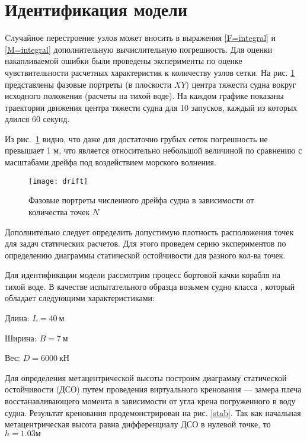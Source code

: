 \section{Идентификация модели}

Cлучайное перестроение узлов может вносить в выражения \eqref{F=integral} и \eqref{M=integral} дополнительную вычислительную погрешность. Для оценки накапливаемой ошибки были проведены эксперименты по оценке чувствительности расчетных характеристик к количеству узлов сетки. На рис. \ref{drift} представлены фазовые портреты  (в плоскости $XY$) центра тяжести судна вокруг исходного положения (расчеты на тихой воде). На каждом графике показаны траектории движения центра тяжести судна для 10 запусков, каждый из которых длился 60 секунд.

Из рис.~\ref{drift} видно, что даже для достаточно грубых сеток погрешность не превышает 1 м, что является относительно небольшой величиной по сравнению с масштабами дрейфа под воздействием морского волнения.

\begin{figure}[ht]
\begin{center}
\texttt{[image: drift]}
\end{center}
\caption{Фазовые портреты численного дрейфа судна в зависимости от количества точек $N$ }
\label{drift}
\end{figure}

Дополнительно следует определить допустимую плотность расположения точек для задач статических расчетов.
Для этого проведем серию экспериментов по определению диаграммы статической остойчивости для разного кол-ва точек.

Для идентификации модели рассмотрим процесс бортовой качки корабля на тихой воде.
В качестве испытательного образца возьмем судно класса , который обладает следующими характеристиками:

\begin{description}
	\item	Длина: $L = 40\ \text{м}$
	\item	Ширина: $B = 7\ \text{м}$
	\item	Вес: $D = 6 000\ \text{кН}$
\end{description}

Для определения метацентрической высоты построим диаграмму статической остойчивости (ДСО) путем проведения виртуального кренования --- замера плеча восстанавливающего момента в зависимости от угла крена погруженного в воду судна. Результат кренования продемонстрирован на рис. \ref{stab}. Так как начальная метацентрическая высота равна дифференциалу ДСО в нулевой точке, то $h=1.03 м$

